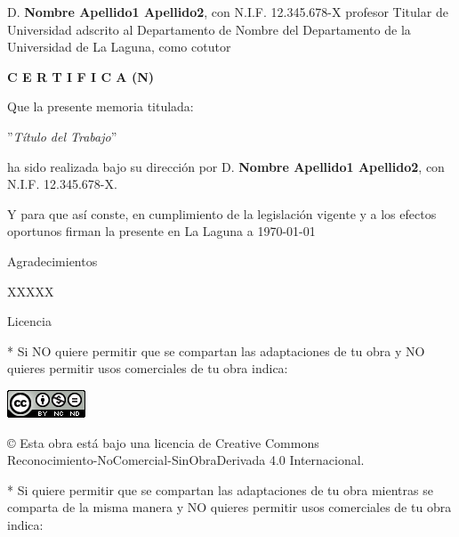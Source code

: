 \documentclass[12pt,a4paper,oneside]{report}
\begin{document}
\bigskip
D. {\bf Nombre Apellido1 Apellido2}, con N.I.F. 12.345.678-X profesor Titular de Universidad adscrito al Departamento de Nombre del Departamento de la Universidad de La Laguna, como cotutor\pagestyle{empty}

\bigskip
\bigskip
{\bf C E R T I F I C A (N)}

\bigskip
\bigskip
Que la presente memoria titulada:

\bigskip
''{\it Título del Trabajo}''

\bigskip
\bigskip
\bigskip

\noindent ha sido realizada bajo su dirección por D. {\bf Nombre Apellido1 Apellido2},
con N.I.F. 12.345.678-X.

\bigskip
\bigskip

Y para que así conste, en cumplimiento de la legislación vigente y a los efectos
oportunos firman la presente en La Laguna a \today

\newpage
\thispagestyle{empty}

{ \flushright

\begin{LARGE}
Agradecimientos
\end{LARGE}

\hspace{3mm}


XXXXX


}
\newpage
\thispagestyle{empty}

\bigskip
\begin{LARGE}
Licencia
\end{LARGE}

\bigskip
* Si NO quiere permitir que se compartan las adaptaciones de tu obra y NO quieres permitir usos comerciales de tu obra indica:

\begin{center}
\includegraphics[scale=1.8]{images/by-nc-nd_88x31}\\[5mm]
\end{center}

© Esta obra está bajo una licencia de Creative Commons \\
  Reconocimiento-NoComercial-SinObraDerivada 4.0 Internacional.

\bigskip
\bigskip
\bigskip
* Si quiere permitir que se compartan las adaptaciones de tu obra mientras se comparta de la misma manera y NO quieres permitir usos comerciales de tu obra indica:
\end{document}
